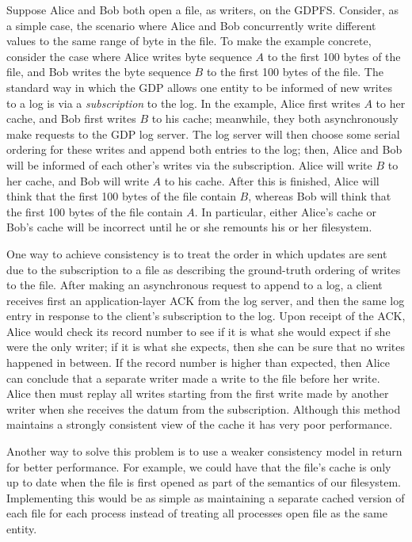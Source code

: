 \documentclass{acm_proc_article-sp}
\begin{document}
Suppose Alice and Bob both open a file, as writers, on the GDPFS. Consider, as a simple case, the scenario where Alice and Bob concurrently write different values to the same range of byte in the file. To make the example concrete, consider the case where Alice writes byte sequence $A$ to the first 100 bytes of the file, and Bob writes the byte sequence $B$ to the first 100 bytes of the file. The standard way in which the GDP allows one entity to be informed of new writes to a log is via a \emph{subscription} to the log. In the example, Alice first writes $A$ to her cache, and Bob first writes $B$ to his cache; meanwhile, they both asynchronously make requests to the GDP log server. The log server will then choose some serial ordering for these writes and append both entries to the log; then, Alice and Bob will be informed of each other's writes via the subscription. Alice will write $B$ to her cache, and Bob will write $A$ to his cache. After this is finished, Alice will think that the first 100 bytes of the file contain $B$, whereas Bob will think that the first 100 bytes of the file contain $A$. In particular, either Alice's cache or Bob's cache will be incorrect until he or she remounts his or her filesystem.

One way to achieve consistency is to treat the order in which updates are sent due to the subscription to a file as describing the ground-truth ordering of writes to the file. After making an asynchronous request to append to a log, a client receives first an application-layer ACK from the log server, and then the same log entry in response to the client's subscription to the log. Upon receipt of the ACK, Alice would check its record number to see if it is what she would expect if she were the only writer; if it is what she expects, then she can be sure that no writes happened in between. If the record number is higher than expected, then Alice can conclude that a separate writer made a write to the file before her write. Alice then must replay all writes starting from the first write made by another writer when she receives the datum from the subscription. Although this method maintains a strongly consistent view of the cache it has very poor performance. 

Another way to solve this problem is to use a weaker consistency model in return for better performance. For example, we could have that the file's cache is only up to date when the file is first opened as part of the semantics of our filesystem. Implementing this would be as simple as maintaining a separate cached version of each file for each process instead of treating all processes open file as the same entity.
\end{document}
